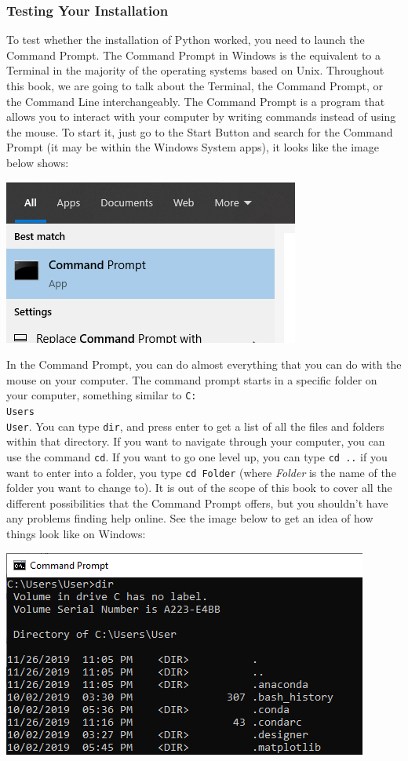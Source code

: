 \subsubsection{Testing Your Installation}
To test whether the installation of Python worked, you need to launch the Command Prompt. The Command Prompt in Windows is the equivalent to a Terminal in the majority of the operating systems based on Unix. Throughout this book, we are going to talk about the Terminal, the Command Prompt, or the Command Line interchangeably. The Command Prompt is a program that allows you to interact with your computer by writing commands instead of using the mouse. To start it, just go to the Start Button and search for the Command Prompt (it may be within the Windows System apps), it looks like the image below shows:

\begin{center}
\includegraphics[width=.5\textwidth]{images/Chapter_02/CommandPrompt.png}
\end{center}

In the Command Prompt, you can do almost everything that you can do with the mouse on your computer. The command prompt starts in a specific folder on your computer, something similar to \texttt{C:\\Users\\User}. You can type \texttt{dir}, and press enter to get a list of all the files and folders within that directory. If you want to navigate through your computer, you can use the command \texttt{cd}. If you want to go one level up, you can type \texttt{cd ..} if you want to enter into a folder, you type \texttt{cd Folder} (where \textit{Folder} is the name of the folder you want to change to). It is out of the scope of this book to cover all the different possibilities that the Command Prompt offers, but you shouldn't have any problems finding help online. See the image below to get an idea of how things look like on Windows:

\begin{center}
\includegraphics[width=.5\textwidth]{images/Chapter_02/CommandPrompt03.png}
\end{center}

